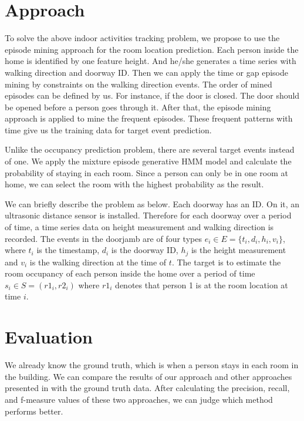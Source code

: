 \section{Approach}
To solve the above indoor activities tracking problem, 
we propose to use the episode mining approach 
for the room location prediction. 
Each person inside the home is identified by one feature height. 
And he/she generates a time series with 
walking direction and doorway ID. 
Then we can apply the time or gap episode mining 
by constraints on the walking direction events. 
The order of mined episodes can be defined by us. 
For instance, if the door is closed. 
The door should be opened before a person goes through it. 
After that, the episode mining approach is applied to mine the frequent episodes. 
These frequent patterns with time give us the training data 
for target event prediction. 

Unlike the occupancy prediction problem, 
there are several target events instead of one. 
We apply the mixture episode generative HMM model and 
calculate the probability of staying in each room. 
Since a person can only be in one room at home, 
we can select the room with the highest probability as the result. 

We can briefly describe the problem as below. 
Each doorway has an ID. On it, an ultrasonic distance sensor is installed. 
Therefore for each doorway over a period of time, 
a time series data on height measurement and walking direction 
is recorded.  
The events in the doorjamb are of four types
$e_i \in E=\{t_i, d_i, h_i, v_i\}$, where 
$t_i$ is the timestamp, 
$d_i$ is the doorway ID, 
$h_j$ is the height measurement and 
$v_i$ is the walking direction at the time of $t$. 
The target is to estimate the room occupancy of each person inside the home 
over a period of time 
$s_i \in S = (r1_i, r2_i)$ where $r1_i$ denotes that person 1 is at the room location at time $i$. 

\section{Evaluation}
We already know the ground truth,  which is when a person stays in each room in the building. 
We can compare the results of our approach and other approaches 
presented in \cite{hnat2012doorjamb} with the ground truth data. 
After calculating the precision, recall, and f-measure values of these two approaches, 
we can judge which method performs better. 


\iffalse
In the first step, 
we can define the discrete event types. 
There are totally three types of events as below. 
\begin{enumerate}
\item When a person walks through a doorway using data from the 
?doorjamb? sensor. 
\item When a person performs a particular hand gesture using data from 
a smart watch.
\item When an appliance turns on using power meter data.
\end{enumerate}
\fi


